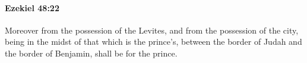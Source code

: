 
		\paragraph{Ezekiel 48:22} %
			\label{EZEKIEL-48-22}

			Moreover from the possession of the Levites, and from the possession of the city, being in the midst of that which is the prince’s, between the border of Judah and the border of Benjamin, shall be for the prince.


